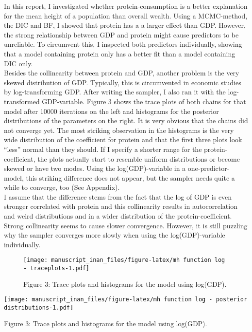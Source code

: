 \documentclass[
]{article}
\begin{document}
In this report, I investigated whether protein-consumption is a better
explanation for the mean height of a population than overall wealth.
Using a MCMC-method, the DIC and BF, I showed that protein has a a
larger effect than GDP. However, the strong relationship between GDP and
protein might cause predictors to be unreliable. To circumvent this, I
inspected both predictors individually, showing that a model containing
protein only has a better fit than a model containing DIC only.\\
Besides the collinearity between protein and GDP, another problem is the
very skewed distribution of GDP. Typically, this is circumvented in
economic studies by log-transforming GDP. After writing the sampler, I
also ran it with the log-transformed GDP-variable. Figure 3 shows the
trace plots of both chains for that model after 10000 iterations on the
left and histograms for the posterior distributions of the parameters on
the right. It is very obvious that the chains did not converge yet. The
most striking observation in the histograms is the very wide
distribution of the coefficient for protein and that the first three
plots look ``less'' normal than they should. If I specify a shorter
range for the protein-coefficient, the plots actually start to resemble
uniform distributions or become skewed or have two modes. Using the
log(GDP)-variable in a one-predictor-model, this striking difference
does not appear, but the sampler needs quite a while to converge, too
(See Appendix).\\
I assume that the difference stems from the fact that the log of GDP is
even stronger correlated with protein and this collinearity results in
autocorrelation and weird distributions and in a wider distribution of
the protein-coefficient. Strong collinearity seems to cause slower
convergence. However, it is still puzzling why the sampler converges
more slowly when using the log(GDP)-variable individually.

\begin{figure}
\centering
\texttt{[image: manuscript\_inan\_files/figure-latex/mh function log - traceplots-1.pdf]}
\caption{\label{fig:figs}Figure 3: Trace plots and histograms for the
model using log(GDP).}
\end{figure}

\texttt{[image: manuscript\_inan\_files/figure-latex/mh function log - posterior distributions-1.pdf]}

Figure 3: Trace plots and histograms for the model using log(GDP).
\end{document}
